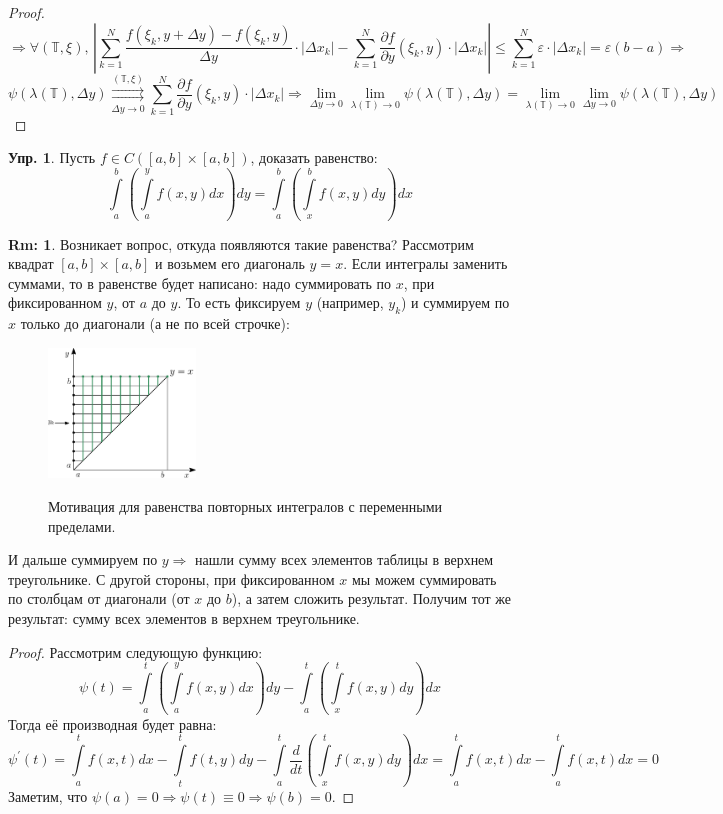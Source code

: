 \documentclass[12pt]{article}
\newcommand{\MTB}{\mathbb{T}}
\newcommand{\VE}{\varepsilon}
\theoremstyle{definition}
\newtheorem{rem}{Rm:}
\newtheorem{exrc}{Упр.}
\newcommand{\ddsum}[2]{\displaystyle\sum\limits_{#1}^{#2}}
\newcommand{\ddint}[2]{\displaystyle\int\limits_{#1}^{#2}}
\newcommand{\uconvm}[2]{\overset{#1}{\underset{#2}{\rightrightarrows}}}
\begin{document}
\begin{proof}
$$	$$
	$$
		\Rightarrow \forall (\MTB, \xi),\, \left|\ddsum{k = 1}{N}\dfrac{f(\xi_k, y+\Delta y) - f(\xi_k, y)}{\Delta y}{\cdot}|\Delta x_k| - \ddsum{k = 1}{N}\dfrac{\partial f}{\partial y}(\xi_k, y){\cdot}|\Delta x_k|\right| \leq \ddsum{k = 1}{N}\VE{\cdot}|\Delta x_k| = \VE (b- a) \Rightarrow
	$$
	$$
		\psi(\lambda(\MTB), \Delta y) \uconvm{(\MTB,\xi)}{\Delta y \to 0} \ddsum{k = 1}{N}\dfrac{\partial f}{\partial y}(\xi_k, y){\cdot}|\Delta x_k| \Rightarrow \lim\limits_{\Delta y \to 0}\lim\limits_{\lambda(\MTB)\to 0}\psi\left(\lambda(\MTB),\Delta y\right) = \lim\limits_{\lambda(\MTB)\to 0}\lim\limits_{\Delta y \to 0}\psi\left(\lambda(\MTB),\Delta y\right) 
	$$
\end{proof}
\begin{exrc}
	Пусть $f \in C([a,b]\times[a,b])$, доказать равенство:
	$$
		\ddint{a}{b}\left(\ddint{a}{y}f(x,y)dx\right) dy = \ddint{a}{b}\left(\ddint{x}{b}f(x,y)dy\right) dx
	$$
\end{exrc}
\begin{rem}
	Возникает вопрос, откуда появляются такие равенства? Рассмотрим квадрат $[a,b]\times [a,b]$ и возьмем его диагональ $y = x$. Если интегралы заменить суммами, то в равенстве будет написано: надо суммировать по $x$, при фиксированном $y$, от $a$ до $y$. То есть фиксируем $y$ (например, $y_k$) и суммируем по $x$ только до диагонали (а не по всей строчке):
	\begin{figure}[H]
		\centering
		\includegraphics[width=0.35\textwidth]{MA3L22_2.eps}
		\label{MA3L22_2}
		\caption{Мотивация для равенства повторных интегралов с переменными пределами.}
		\label{fig:равенство повторных интегралов}
	\end{figure}
	И дальше суммируем по $y \Rightarrow$ нашли сумму всех элементов таблицы в верхнем треугольнике. С другой стороны, при фиксированном $x$ мы можем суммировать по столбцам от диагонали (от $x$ до $b$), а затем сложить результат. Получим тот же результат: сумму всех элементов в верхнем треугольнике.
\end{rem}

\begin{proof}
	Рассмотрим следующую функцию:
	$$
		\psi(t) = \ddint{a}{t}\left(\ddint{a}{y}f(x,y)dx\right)dy - \ddint{a}{t}\left(\ddint{x}{t}f(x,y)dy\right) dx
	$$
	Тогда её производная будет равна:
	$$
		\psi^\prime(t) = \ddint{a}{t}f(x,t)dx - \ddint{t}{t}f(t,y)dy - \ddint{a}{t}\dfrac{d}{dt}\left(\ddint{x}{t}f(x,y)dy\right)dx = \ddint{a}{t}f(x,t)dx - \ddint{a}{t}f(x,t)dx = 0
	$$
	Заметим, что $\psi(a) = 0 \Rightarrow \psi(t) \equiv 0 \Rightarrow \psi(b) = 0$.
\end{proof}
\newpage
\end{document}
